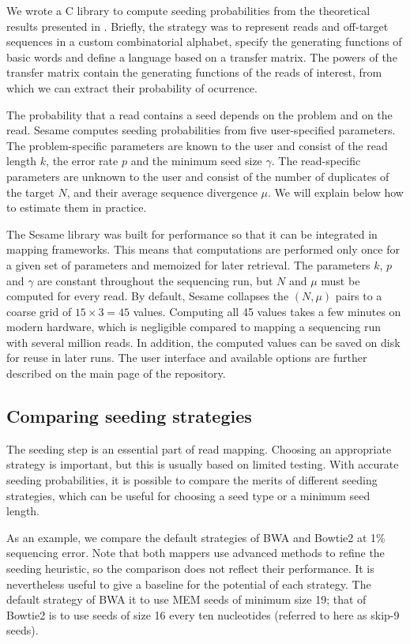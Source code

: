 \documentclass[a4,center,fleqn]{NAR}
\begin{document}
We wrote a C library to compute seeding probabilities from the theoretical
results presented in \cite{1}. Briefly, the strategy was to represent
reads and off-target sequences in a custom combinatorial alphabet, specify
the generating functions of basic words and define a language based on a
transfer matrix. The powers of the transfer matrix contain the generating
functions of the reads of interest, from which we can extract their
probability of ocurrence.

The probability that a read contains a seed depends on the problem and on
the read. Sesame computes seeding probabilities from five user-specified
parameters. The problem-specific parameters are known to the user and
consist of the read length $k$, the error rate $p$ and the minimum seed
size $\gamma$. The read-specific parameters are unknown to the user and
consist of the number of duplicates of the target $N$, and their average
sequence divergence $\mu$. We will explain below how to estimate them in
practice.

The Sesame library was built for performance so that it can be integrated
in mapping frameworks. This means that computations are performed only
once for a given set of parameters and memoized for later retrieval. The
parameters $k$, $p$ and $\gamma$ are constant throughout the sequencing
run, but $N$ and $\mu$ must be computed for every read. By default, Sesame
collapses the $(N, \mu)$ pairs to a coarse grid of $15 \times 3=45$
values. Computing all 45 values takes a few minutes on modern hardware,
which is negligible compared to mapping a sequencing run with several
million reads. In addition, the computed values can be saved on disk for
reuse in later runs. The user interface and available options are further
described on the main page of the repository.


\subsection{Comparing seeding strategies}

The seeding step is an essential part of read mapping. Choosing an
appropriate strategy is important, but this is usually based on limited
testing. With accurate seeding probabilities, it is possible to compare
the merits of different seeding strategies, which can be useful for
choosing a seed type or a minimum seed length.

As an example, we compare the default strategies of BWA and Bowtie2 at 1\%
sequencing error. Note that both mappers use advanced methods to refine
the seeding heuristic, so the comparison does not reflect their
performance. It is nevertheless useful to give a baseline for the
potential of each strategy. The default strategy of BWA it to use MEM
seeds of minimum size 19; that of Bowtie2 is to use seeds of size 16 every
ten nucleotides (referred to here as skip-9 seeds).
\end{document}
